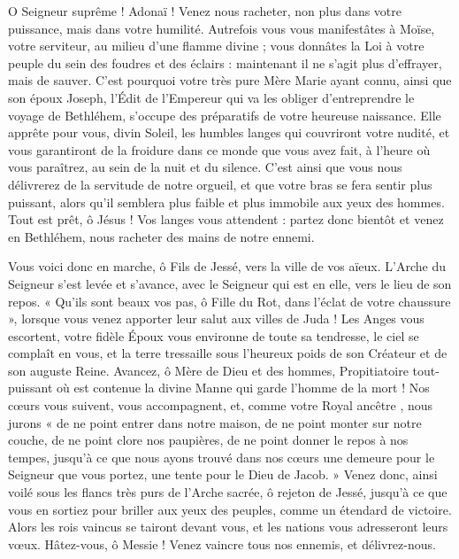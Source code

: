\documentclass[%
fontsize=10%
,a6paper%
,DIV=15%
]{scrartcl}
\begin{document}

O Seigneur suprême ! Adonaï ! Venez nous racheter, non plus dans votre puissance, mais dans votre humilité. Autrefois vous vous manifestâtes à Moïse, votre serviteur, au milieu d’une flamme divine ; vous donnâtes la Loi à votre peuple du sein des foudres et des éclairs : maintenant il ne s’agit plus d’effrayer, mais de sauver. C’est pourquoi votre très pure Mère Marie ayant connu, ainsi que son époux Joseph, l’Édit de l’Empereur qui va les obliger d’entreprendre le voyage de Bethléhem, s’occupe des préparatifs de votre heureuse naissance. Elle apprête pour vous, divin Soleil, les humbles langes qui couvriront votre nudité, et vous garantiront de la froidure dans ce monde que vous avez fait, à l’heure où vous paraîtrez, au sein de la nuit et du silence. C’est ainsi que vous nous délivrerez de la servitude de notre orgueil, et que votre bras se fera sentir plus puissant, alors qu’il semblera plus faible et plus immobile aux yeux des hommes. Tout est prêt, ô Jésus ! Vos langes vous attendent : partez donc bientôt et venez en Bethléhem, nous racheter des mains de notre ennemi.


Vous voici donc en marche, ô Fils de Jessé, vers la ville de vos aïeux. L’Arche du Seigneur s’est levée et s’avance, avec le Seigneur qui est en elle, vers le lieu de son repos. « Qu’ils sont beaux vos pas, ô Fille du Rot, dans l’éclat de votre chaussure », lorsque vous venez apporter leur salut aux villes de Juda ! Les Anges vous escortent, votre fidèle Époux vous environne de toute sa tendresse, le ciel se complaît en vous, et la terre tressaille sous l’heureux poids de son Créateur et de son auguste Reine. Avancez, ô Mère de Dieu et des hommes, Propitiatoire tout-puissant où est contenue la divine Manne qui garde l’homme de la mort ! Nos cœurs vous suivent, vous accompagnent, et, comme votre Royal ancêtre , nous jurons « de ne point entrer dans notre maison, de ne point monter sur notre couche, de ne point clore nos paupières, de ne point donner le repos à nos tempes, jusqu’à ce que nous ayons trouvé dans nos cœurs une demeure pour le Seigneur que vous portez, une tente pour le Dieu de Jacob. » Venez donc, ainsi voilé sous les flancs très purs de l’Arche sacrée, ô rejeton de Jessé, jusqu’à ce que vous en sortiez pour briller aux yeux des peuples, comme un étendard de victoire. Alors les rois vaincus se tairont devant vous, et les nations vous adresseront leurs vœux. Hâtez-vous, ô Messie ! Venez vaincre tous nos ennemis, et délivrez-nous.
\end{document}
